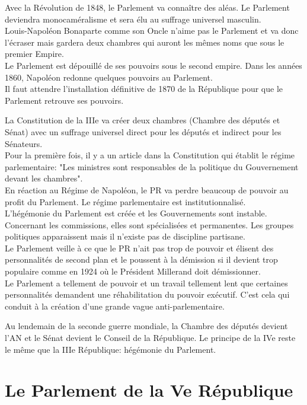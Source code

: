 \documentclass[12pt, a4paper, openany]{book}
\begin{document}
Avec la Révolution de 1848, le Parlement va connaître des aléas. Le Parlement deviendra monocaméralisme et sera élu au suffrage universel masculin.\\
Louis-Napoléon Bonaparte comme son Oncle n'aime pas le Parlement et va donc l'écraser mais gardera deux chambres qui auront les mêmes noms que sous le premier Empire. \\
Le Parlement est dépouillé de ses pouvoirs sous le second empire. Dans les années 1860, Napoléon redonne quelques pouvoirs au Parlement. \\
Il faut attendre l'installation définitive de 1870 de la République pour que le Parlement retrouve ses pouvoirs.


La Constitution de la IIIe va créer deux chambres (Chambre des députés et Sénat) avec un suffrage universel direct pour les députés et indirect pour les Sénateurs. \\
Pour la première fois, il y a un article dans la Constitution qui établit le régime parlementaire: "Les ministres sont responsables de la politique du Gouvernement devant les chambres". \\
En réaction au Régime de Napoléon, le PR va perdre beaucoup de pouvoir au profit du Parlement. Le régime parlementaire est institutionnalisé. \\
L'hégémonie du Parlement est créée et les Gouvernements sont instable. \\
Concernant les commissions, elles sont spécialisées et permanentes. Les groupes politiques apparaissent mais il n'existe pas de discipline partisane. \\
Le Parlement veille à ce que le PR n'ait pas trop de pouvoir et élisent des personnalités de second plan et le poussent à la démission si il devient trop populaire comme en 1924 où le Président Millerand doit démissionner. \\
Le Parlement a tellement de pouvoir et un travail tellement lent que certaines personnalités demandent une réhabilitation du pouvoir exécutif. C'est cela qui conduit à la création d'une grande vague anti-parlementaire.


Au lendemain de la seconde guerre mondiale, la Chambre des députés devient l'AN et le Sénat devient le Conseil de la République. Le principe de la IVe reste le même que la IIIe République: hégémonie du Parlement. 


\section{Le Parlement de la Ve République}
\end{document}
